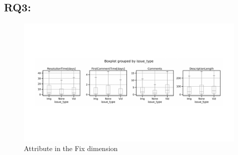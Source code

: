 \subsection*{RQ3: \RQthree{}}
\begin{figure}[t]
    \centering
    \includegraphics[width=0.5\linewidth]{./figures/fixes.pdf}
    \caption{Attribute in the Fix dimension}
    \label{fig:resolvedtime}
\end{figure}

